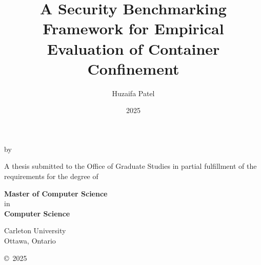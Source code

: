 \title{A Security Benchmarking Framework for Empirical Evaluation of Container Confinement}
\author{Huzaifa Patel}
\date{2025}

\makeatletter
\begin{titlepage}
    \begin{center}
        \vspace*{3cm} %

        {\LARGE \textbf{\@title} \par} %

        \vspace{0.5cm}

        \vspace{2cm}
        \large{by}
        \vspace{0.5cm}

        {\Large \textbf{\@author}} %

        \vfill

        {\large A thesis submitted to the Office of Graduate Studies
in partial fulfillment of the requirements for the degree of}

        \vspace{1cm}

        \large{{\textbf{Master of Computer Science}} \\
        {in} \\
        {\textbf{Computer Science}}}
        

        \vspace{2cm}

        \large{Carleton University\\
        Ottawa, Ontario}

        \vspace{1.5cm}


        \vfill

        \copyright{}~2025 \\
        \@author
    \end{center}
\end{titlepage}
\makeatother